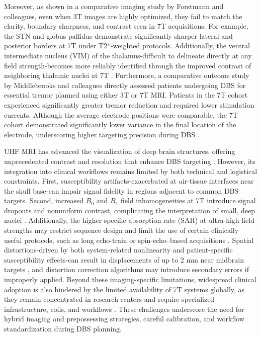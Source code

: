 Moreover, as shown in a comparative imaging study by Forstmann and colleagues, even when 3T images are highly optimized, they fail to match the clarity, boundary sharpness, and contrast seen in 7T acquisitions. For example, the STN and globus pallidus demonstrate significantly sharper lateral and posterior borders at 7T under T2*-weighted protocols. Additionally, the ventral intermediate nucleus (VIM) of the thalamus-difficult to delineate directly at any field strength-becomes more reliably identified through the improved contrast of neighboring thalamic nuclei at 7T \cite{Forstmann2017-gz}. Furthermore, a comparative outcome study by Middlebrooks and colleagues directly assessed patients undergoing DBS for essential tremor planned using either 3T or 7T MRI. Patients in the 7T cohort experienced significantly greater tremor reduction and required lower stimulation currents. Although the average electrode positions were comparable, the 7T cohort demonstrated significantly lower variance in the final location of the electrode, underscoring higher targeting precision during DBS \cite{Middlebrooks2024-gb}.

UHF MRI has advanced the visualization of deep brain structures, offering unprecedented contrast and resolution that enhance DBS targeting \cite{Isaacs2020-gq}. However, its integration into clinical workflows remains limited by both technical and logistical constraints. First, susceptibility artifacts-exacerbated at air-tissue interfaces near the skull base-can impair signal fidelity in regions adjacent to common DBS targets. Second, increased \(B_0\) and \(B_1\) field inhomogeneities at 7T introduce signal dropouts and nonuniform contrast, complicating the interpretation of small, deep nuclei \cite{Okada2022-fg}. Additionally, the higher specific absorption rate (SAR) at ultra-high field strengths may restrict sequence design and limit the use of certain clinically useful protocols, such as long echo-train or spin-echo–based acquisitions \cite{Okada2022-ln}. Spatial distortions-driven by both system-related nonlinearity and patient-specific susceptibility effects-can result in displacements of up to 2 mm near midbrain targets \cite{Kirby2023-la}, and distortion correction algorithms may introduce secondary errors if improperly applied. Beyond these imaging-specific limitations, widespread clinical adoption is also hindered by the limited availability of 7T systems globally, as they remain concentrated in research centers and require specialized infrastructure, coils, and workflows \cite{Forstmann2017-gz,Boutet2021-vg}. These challenges underscore the need for hybrid imaging and prepossessing strategies, careful calibration, and workflow standardization during DBS planning.

